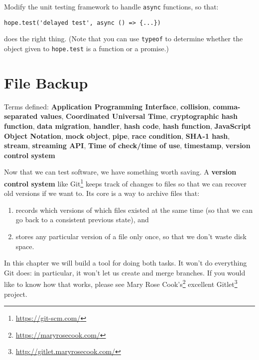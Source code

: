 \documentclass[krantzl]{krantz}
\newcommand{\glossref}[1]{\textbf{#1}}
\newcommand{\hreffoot}[2]{{#1}\footnote{\href{#2}{#2}}}
\begin{document}
Modify the unit testing framework to handle \texttt{async} functions,
so that:

\begin{lstlisting}[frame=tblr]
hope.test('delayed test', async () => {...})
\end{lstlisting}


\noindent does the right thing.
(Note that you can use \texttt{typeof} to determine whether the object given to \texttt{hope.test}
is a function or a promise.)

\chapter{File Backup}\label{file-backup}


\noindent 
  Terms defined: \glossref{Application Programming Interface}, \glossref{collision}, \glossref{comma-separated values}, \glossref{Coordinated Universal Time}, \glossref{cryptographic hash function}, \glossref{data migration}, \glossref{handler}, \glossref{hash code}, \glossref{hash function}, \glossref{JavaScript Object Notation}, \glossref{mock object}, \glossref{pipe}, \glossref{race condition}, \glossref{SHA-1 hash}, \glossref{stream}, \glossref{streaming API}, \glossref{Time of check/time of use}, \glossref{timestamp}, \glossref{version control system}



Now that we can test software, we have something worth saving.
A \glossref{version control system}
like \hreffoot{Git}{https://git-scm.com/}
keeps track of changes to files
so that we can recover old versions if we want to.
Its core is a way to archive files that:

\begin{enumerate}

\item records which versions of which files existed at the same time
    (so that we can go back to a consistent previous state), and

\item stores any particular version of a file only once,
    so that we don’t waste disk space.

\end{enumerate}


In this chapter we will build a tool for doing both tasks.
It won’t do everything Git does:
in particular, it won’t let us create and merge branches.
If you would like to know how that works,
please see \hreffoot{Mary Rose Cook’s}{https://maryrosecook.com/} excellent \hreffoot{Gitlet}{http://gitlet.maryrosecook.com/} project.
\end{document}
